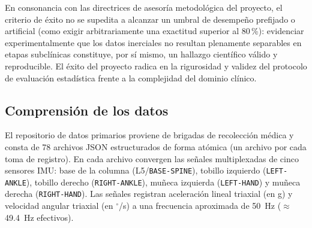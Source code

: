 \documentclass[12pt,a4paper]{article}
\begin{document}
En consonancia con las directrices de asesoría metodológica del proyecto, el criterio de éxito no se supedita a alcanzar un umbral de desempeño prefijado o artificial (como exigir arbitrariamente una exactitud superior al 80\,\%): evidenciar experimentalmente que los datos inerciales no resultan plenamente separables en etapas subclínicas constituye, por sí mismo, un hallazgo científico válido y reproducible. El éxito del proyecto radica en la rigurosidad y validez del protocolo de evaluación estadística frente a la complejidad del dominio clínico.

\subsection{Comprensión de los datos}\label{sec:met-datos}

El repositorio de datos primarios proviene de brigadas de recolección médica y consta de 78 archivos JSON estructurados de forma atómica (un archivo por cada toma de registro). En cada archivo convergen las señales multiplexadas de cinco sensores IMU: base de la columna (L5/\texttt{BASE-SPINE}), tobillo izquierdo (\texttt{LEFT-ANKLE}), tobillo derecho (\texttt{RIGHT-ANKLE}), muñeca izquierda (\texttt{LEFT-HAND}) y muñeca derecha (\texttt{RIGHT-HAND}). Las señales registran aceleración lineal triaxial (en g) y velocidad angular triaxial (en $^\circ$/s) a una frecuencia aproximada de 50~Hz ($\approx$49.4~Hz efectivos).
\end{document}
